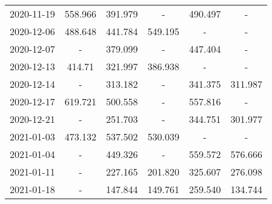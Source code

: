 \begin{table*}[t]
\begin{tabular}{cccccc}
2020-11-19 &                        558.966 &  {\cellcolor{blue!25} 391.979} &                              - &         490.497 &                              - \\
2020-12-06 &                        488.648 &  {\cellcolor{blue!25} 441.784} &                        549.195 &               - &                              - \\
2020-12-07 &                              - &  {\cellcolor{blue!25} 379.099} &                              - &         447.404 &                              - \\
2020-12-13 &                         414.71 &  {\cellcolor{blue!25} 321.997} &                        386.938 &               - &                              - \\
2020-12-14 &                              - &                        313.182 &                              - &         341.375 &  {\cellcolor{blue!25} 311.987} \\
2020-12-17 &                        619.721 &  {\cellcolor{blue!25} 500.558} &                              - &         557.816 &                              - \\
2020-12-21 &                              - &  {\cellcolor{blue!25} 251.703} &                              - &         344.751 &                        301.977 \\
2021-01-03 &  {\cellcolor{blue!25} 473.132} &                        537.502 &                        530.039 &               - &                              - \\
2021-01-04 &                              - &  {\cellcolor{blue!25} 449.326} &                              - &         559.572 &                        576.666 \\
2021-01-11 &                              - &                        227.165 &  {\cellcolor{blue!25} 201.820} &         325.607 &                        276.098 \\
2021-01-18 &                              - &                        147.844 &                        149.761 &         259.540 &  {\cellcolor{blue!25} 134.744} \\
\bottomrule
\end{tabular}

\end{table*}

